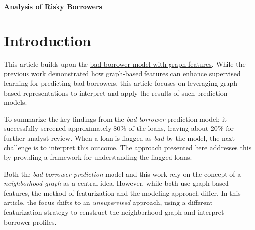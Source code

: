 \documentclass[12pt]{article}
\begin{document}
\begin{tcolorbox}[halign=flush center]
         \textbf{Analysis of Risky Borrowers}
   
 \end{tcolorbox}

\section{Introduction}
This article builds upon the \href{https://github.com/rajivsam/descriptive_analytics/blob/main/examples/sba_7a_loans_analysis/sba_7a_loans_desc_analysis.pdf}{bad borrower model with graph features}. While the previous work demonstrated how graph-based features can enhance supervised learning for predicting bad borrowers, this article focuses on leveraging graph-based representations to interpret and apply the results of such prediction models. 

To summarize the key findings from the \emph{bad borrower} prediction model: it successfully screened approximately $80\%$ of the loans, leaving about $20\%$ for further analyst review. When a loan is flagged as \emph{bad} by the model, the next challenge is to interpret this outcome. The approach presented here addresses this by providing a framework for understanding the flagged loans.

Both the \emph{bad borrower prediction} model and this work rely on the concept of a \emph{neighborhood graph} as a central idea. However, while both use graph-based features, the method of featurization and the modeling approach differ. In this article, the focus shifts to an \emph{unsupervised} approach, using a different featurization strategy to construct the neighborhood graph and interpret borrower profiles.
\end{document}
